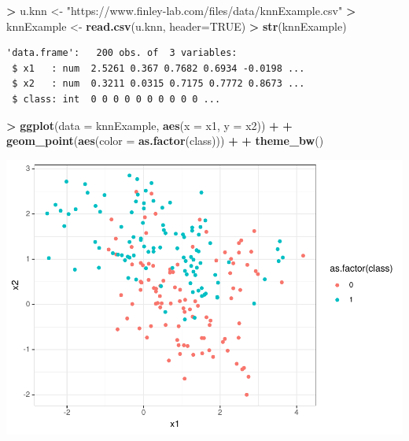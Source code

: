 \documentclass[
]{krantz}
\makeatletter
\newenvironment{Shaded}{\begin{snugshade}}{\end{snugshade}}
\newcommand{\DataTypeTok}[1]{\textcolor[rgb]{0.27,0.27,0.27}{#1}}
\newcommand{\KeywordTok}[1]{\textcolor[rgb]{0.27,0.27,0.27}{\textbf{#1}}}
\newcommand{\NormalTok}[1]{#1}
\newcommand{\OperatorTok}[1]{\textcolor[rgb]{0.43,0.43,0.43}{\textbf{#1}}}
\newcommand{\OtherTok}[1]{\textcolor[rgb]{0.37,0.37,0.37}{#1}}
\newcommand{\StringTok}[1]{\textcolor[rgb]{0.5,0.5,0.5}{#1}}
\newenvironment{kframe}{%
\medskip{}
\setlength{\fboxsep}{.8em}
 \def\at@end@of@kframe{}%
 \ifinner\ifhmode%
  \def\at@end@of@kframe{\end{minipage}}%
  \begin{minipage}{\columnwidth}%
 \fi\fi%
 \def\FrameCommand##1{\hskip\@totalleftmargin \hskip-\fboxsep
 \colorbox{shadecolor}{##1}\hskip-\fboxsep
     \hskip-\linewidth \hskip-\@totalleftmargin \hskip\columnwidth}%
 \MakeFramed {\advance\hsize-\width
   \@totalleftmargin\z@ \linewidth\hsize
   \@setminipage}}%
 {\par\unskip\endMakeFramed%
 \at@end@of@kframe}
\renewenvironment{Shaded}{\begin{kframe}}{\end{kframe}}
\makeatother
\begin{document}
\begin{Shaded}
\begin{Highlighting}[]
\OperatorTok{\textgreater{}}\StringTok{ }\NormalTok{u.knn \textless{}{-}}\StringTok{ "https://www.finley{-}lab.com/files/data/knnExample.csv"}
\OperatorTok{\textgreater{}}\StringTok{ }\NormalTok{knnExample \textless{}{-}}\StringTok{ }\KeywordTok{read.csv}\NormalTok{(u.knn, }\DataTypeTok{header=}\OtherTok{TRUE}\NormalTok{)}
\OperatorTok{\textgreater{}}\StringTok{ }\KeywordTok{str}\NormalTok{(knnExample)}
\end{Highlighting}
\end{Shaded}

\begin{verbatim}
'data.frame':   200 obs. of  3 variables:
 $ x1   : num  2.5261 0.367 0.7682 0.6934 -0.0198 ...
 $ x2   : num  0.3211 0.0315 0.7175 0.7772 0.8673 ...
 $ class: int  0 0 0 0 0 0 0 0 0 0 ...
\end{verbatim}

\begin{Shaded}
\begin{Highlighting}[]
\OperatorTok{\textgreater{}}\StringTok{ }\KeywordTok{ggplot}\NormalTok{(}\DataTypeTok{data =}\NormalTok{ knnExample, }\KeywordTok{aes}\NormalTok{(}\DataTypeTok{x =}\NormalTok{ x1, }\DataTypeTok{y =}\NormalTok{ x2)) }\OperatorTok{+}\StringTok{ }
\OperatorTok{+}\StringTok{    }\KeywordTok{geom\_point}\NormalTok{(}\KeywordTok{aes}\NormalTok{(}\DataTypeTok{color =} \KeywordTok{as.factor}\NormalTok{(class))) }\OperatorTok{+}
\OperatorTok{+}\StringTok{    }\KeywordTok{theme\_bw}\NormalTok{()}
\end{Highlighting}
\end{Shaded}

\includegraphics{bookdown_files/figure-latex/unnamed-chunk-252-1.pdf}
\end{document}

